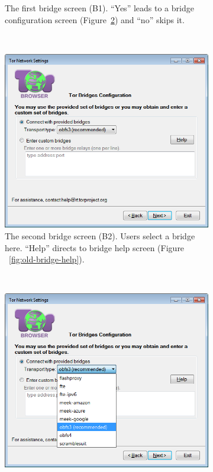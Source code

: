 \documentclass[USenglish,oneside,twocolumn]{article}
\begin{document}
\begin{figure}
\begin{subfigure}[b]{0.30\textwidth}
	\centering\captionsetup{width=1.5\linewidth}%
	\caption{The first bridge screen (B1). ``Yes'' leads to a bridge configuration screen (Figure~\ref{fig:old-bridge-settings}) and ``no'' skips it.}
	\label{fig:old-bridge}
\end{subfigure}
~~~~~~~~~~
\begin{subfigure}[b]{0.30\textwidth}
	\includegraphics[width=\textwidth]{screenshots/OLD-bridgeSettings.png}
	\centering\captionsetup{width=1.5\linewidth}%
	\caption{The second bridge screen (B2). Users select a bridge here. ``Help'' directs to bridge help screen (Figure ~\ref{fig:old-bridge-help}). }
	\label{fig:old-bridge-settings}
\end{subfigure}
~~~~~~~~~~~~~~~~~~~~~~~~~
\begin{subfigure}[b]{0.30\textwidth}
	\includegraphics[width=\textwidth]{screenshots/OLD-bridgeSettings-combobox.png}

\end{subfigure}
\end{figure}
\end{document}
